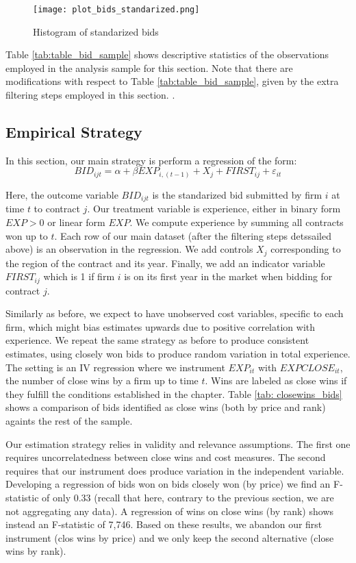 \begin{figure}
  \centering
  \texttt{[image: plot\_bids\_standarized.png]}
  \caption{Histogram of standarized bids}
  \label{fig:plot_bids_standarized}
\end{figure}

Table \ref{tab:table_bid_sample} shows descriptive statistics of the observations employed in the analysis sample for this section. Note that there are modifications with respect to Table \ref{tab:table_bid_sample}, given by the extra filtering steps employed in this section. .

\subsection{Empirical Strategy}

In this section, our main strategy is perform a regression of the form:
\begin{equation}
\label{eqn:olsspec}
BID_{ijt}=\alpha+ \beta EXP_{i,(t-1)}+X_j+FIRST_{ij}+\varepsilon_{it}
\end{equation}

 Here, the outcome variable $BID_{ijt}$ is the standarized bid submitted by firm  $i$ at time $t$  to contract $j$. Our treatment variable is experience, either in binary form $EXP>0$ or linear form $EXP$. We compute experience by summing all contracts won up to $t$. Each row of our main dataset (after the filtering steps detssailed above) is an observation in the regression. We add controls $X_j$ corresponding to the region of the contract and its year. Finally, we add an indicator variable $FIRST_{ij}$ which is 1 if firm $i$ is on its first year in the market when bidding for contract $j$.

Similarly as before, we expect to have unobserved cost variables, specific to each firm, which might bias estimates upwards due to positive correlation with experience. We repeat the same strategy as before to produce consistent estimates, using closely won bids to produce random variation in total experience. The setting is an IV regression where we instrument $EXP_{it}$ with $EXPCLOSE_{it}$, the number of close wins by a firm up to time $t$. Wins are labeled as close wins if they fulfill the conditions established in the  chapter. Table \ref{tab: closewins_bids} shows a comparison of bids identified as close wins (both by price and rank) againts the rest of the sample.

Our estimation strategy relies in validity and relevance assumptions. The first one requires uncorrelatedness between close wins and cost measures. The second requires that our instrument does produce variation in the independent variable. Developing a regression of bids won on bids closely won (by price) we find  an F-statistic of only 0.33 (recall that here, contrary to the previous section, we are not aggregating any data). A regression of wins on close wins (by rank) shows instead an F-statistic of 7,746. Based on these results, we abandon our first instrument (clos wins by price) and we only keep the second alternative (close wins by rank).

